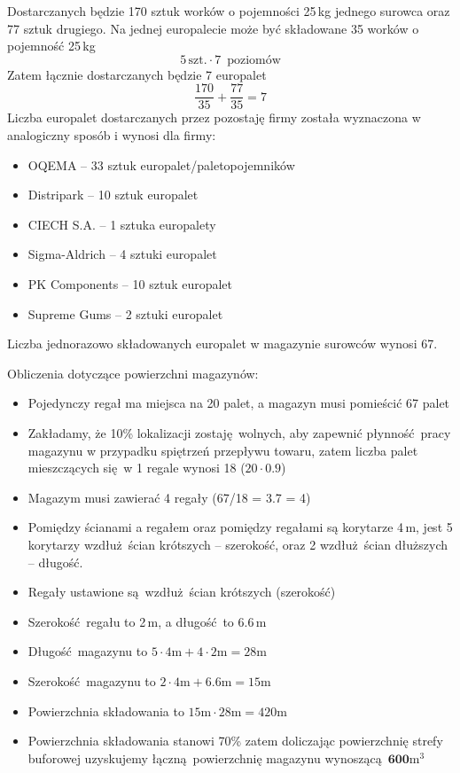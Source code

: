 Dostarczanych będzie 170 sztuk worków o pojemności 25\,kg jednego surowca oraz 77 sztuk drugiego. Na jednej europalecie może być składowane 35 worków o pojemność 25\,kg
\[
	5\,\mathrm{szt.} \cdot 7\,\text{ poziomów}
\]
Zatem łącznie dostarczanych będzie 7 europalet
\[
	\frac{170}{35} + \frac{77}{35} = 7
\]
Liczba europalet dostarczanych przez pozostaję firmy została wyznaczona w analogiczny sposób i wynosi dla firmy:
\begin{itemize}
	\item \textsf{OQEMA} -- 33 sztuk europalet/paletopojemników
	\item \textsf{Distripark} -- 10 sztuk europalet
	\item \textsf{CIECH S.A.} -- 1 sztuka europalety
	\item \textsf{Sigma-Aldrich} -- 4 sztuki europalet
	\item \textsf{PK Components} -- 10 sztuk europalet
	\item \textsf{Supreme Gums} -- 2 sztuki europalet
\end{itemize}

Liczba jednorazowo składowanych europalet w magazynie surowców wynosi 67.\vspace{\baselineskip}

Obliczenia dotyczące powierzchni magazynów:
\begin{itemize}
	\item Pojedynczy regał ma miejsca na 20 palet, a magazyn musi pomieścić 67 palet
	\item Zakładamy, że 10\% lokalizacji zostaję wolnych, aby zapewnić płynność pracy magazynu w przypadku spiętrzeń przepływu towaru, zatem liczba palet mieszczących się w 1 regale wynosi 18 ($20 \cdot 0.9$)
	\item Magazym musi zawierać 4 regały (67/18 = 3.7 = 4)
	\item Pomiędzy ścianami a regałem oraz pomiędzy regałami są korytarze 4\,m, jest 5 korytarzy wzdłuż ścian krótszych -- szerokość, oraz 2 wzdłuż ścian dłuższych -- długość.
	\item Regały ustawione są wzdłuż ścian krótszych (szerokość)
	\item Szerokość regału to 2\,m, a długość to 6.6\,m
	\item Długość magazynu to $5 \cdot 4\mathrm{m} + 4 \cdot 2\mathrm{m} = 28\mathrm{m}$
	\item Szerokość magazynu to $2\cdot 4\mathrm{m} + 6.6\mathrm{m} = 15\mathrm{m}$
	\item Powierzchnia składowania to $15\mathrm{m} \cdot 28\mathrm{m} = 420\mathrm{m}$
	\item Powierzchnia składowania stanowi 70\% zatem doliczając powierzchnię strefy buforowej uzyskujemy łączną powierzchnię magazynu wynoszącą $\mathbf{600\mathrm{m^{3}}}$
\end{itemize}\vspace{\baselineskip}


